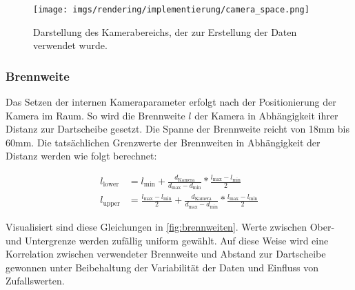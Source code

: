 \begin{figure}
    \centering
    \texttt{[image: imgs/rendering/implementierung/camera\_space.png]}
    \caption{Darstellung des Kamerabereichs, der zur Erstellung der Daten verwendet wurde.}
    \label{img:camera_space}
\end{figure}

\subsubsection{Brennweite}

Das Setzen der internen Kameraparameter erfolgt nach der Positionierung der Kamera im Raum. So wird die Brennweite $l$ der Kamera in Abhängigkeit ihrer Distanz zur Dartscheibe gesetzt. Die Spanne der Brennweite reicht von 18mm bis 60mm. Die tatsächlichen Grenzwerte der Brennweiten in Abhängigkeit der Distanz werden wie folgt berechnet:

\begin{align*}
    l_\text{lower} & = l_\text{min} + \frac{d_\text{Kamera}}{d_\text{max} - d_\text{min}} * \frac{l_\text{max} - l_\text{min}}{2}                          \\
    l_\text{upper} & = \frac{l_\text{max} - l_\text{min}}{2} + \frac{d_\text{Kamera}}{d_\text{max} - d_\text{min}} * \frac{l_\text{max} - l_\text{min}}{2}
\end{align*}

Visualisiert sind diese Gleichungen in \autoref{fig:brennweiten}. Werte zwischen Ober- und Untergrenze werden zufällig uniform gewählt. Auf diese Weise wird eine Korrelation zwischen verwendeter Brennweite und Abstand zur Dartscheibe gewonnen unter Beibehaltung der Variabilität der Daten und Einfluss von Zufallswerten.

